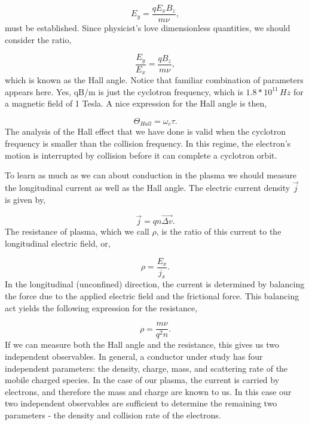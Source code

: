\documentclass{../lab}
\begin{document}
\begin{equation}
    E_y = \frac {qE_xB_z} {m \nu} ,
\end{equation}
must be established. Since physicist's love dimensionless quantities, we should consider the ratio,

\begin{equation}
    \frac{E_y}{E_x} = \frac {qB_z} {m \nu} ,
\end{equation}
which is known as the Hall angle. Notice that familiar combination of parameters appears here. Yes, qB/m is just the cyclotron frequency, which is $1.8*10^{11}\,Hz$ for a magnetic field of 1 Tesla. A nice expression for the Hall angle is then,

\begin{equation}
    \Theta_{Hall} = \omega_c\tau .
\end{equation}
The analysis of the Hall effect that we have done is valid when the cyclotron frequency is smaller than the collision frequency. In this regime, the electron's motion is interrupted by collision before it can complete a cyclotron orbit.

To learn as much as we can about conduction in the plasma we should measure the longitudinal current as well as the Hall angle. The electric current density $ \vec {j}$ is given by,

\begin{equation}
    \vec{j} = q n \vec {\Delta v}.
\end{equation}
The resistance of plasma, which we call $ \rho$, is the ratio of this current to the longitudinal electric field, or,

\begin{equation}
    \rho = \frac{E_x}{j_x}.
\end{equation}
In the longitudinal (unconfined) direction, the current is determined by balancing the force due to the applied electric field and the frictional force. This balancing act yields the following expression for the resistance,

\begin{equation}
    \rho = \frac{m\nu}{q^2n}.
\end{equation}
If we can measure both the Hall angle and the resistance, this gives us two independent observables. In general, a conductor under study has four independent parameters: the density, charge, mass, and scattering rate of the mobile charged species. In the case of our plasma, the current is carried by electrons, and therefore the mass and charge are known to us. In this case our two independent observables are sufficient to determine the remaining two parameters - the density and collision rate of the electrons.
\end{document}

